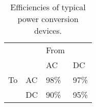 \begin{table}
\centering
\caption{Efficiencies of typical power conversion devices.}
\label{tab:conv_eff}
\begin{tabular}{|ll|l|l|}
\hline
	&				& \multicolumn{1}{l}{From}	&				\\ \cline{3-4} 
	&				& AC				& DC				\\ \hline 
To	& \multicolumn{1}{|l|}{AC}	& 98\% \cite{Starke2008}	& 97\%  \cite{Starke2008}	\\ \cline{2-4} 
	& \multicolumn{1}{|l|}{DC}	& 90\% \cite{Pang2006}		& 95\% \cite{Starke2008}	\\ \hline
\end{tabular}
\end{table}
